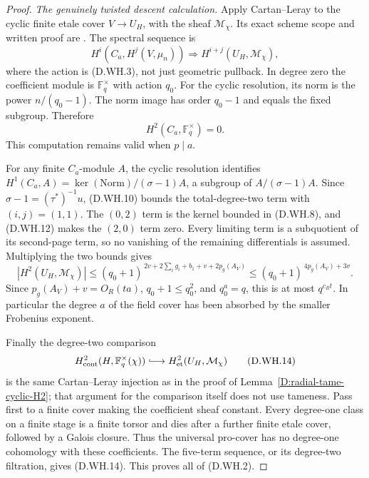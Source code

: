 \begin{proof}
\emph{The genuinely twisted descent calculation.}
Apply Cartan--Leray to the cyclic finite etale cover
\(V\to U_H\), with the sheaf \(\mathcal M_\chi\).
Its exact scheme scope and written proof are
\citet[Theorem 14.9 and Remark 14.10, pp.96--97]
{MilneLEC2013H2D}. The spectral sequence is
\[
 H^i(C_a,H^j(V,\mu_n))\Longrightarrow
                          H^{i+j}(U_H,\mathcal M_\chi),
                                                        \tag{D.WH.11}
\]
where the action is (D.WH.3), not just geometric
pullback. In degree zero the coefficient module is
\(\mathbb F_q^\times\) with action \(q_0\).
For the cyclic resolution, its norm is the power
\(n/(q_0-1)\). The norm image has order \(q_0-1\)
and equals the fixed subgroup. Therefore
\[
                       H^2(C_a,\mathbb F_q^\times)=0.
                                                        \tag{D.WH.12}
\]
This computation remains valid when \(p\mid a\).

For any finite \(C_a\)-module \(A\), the cyclic
resolution identifies
\(H^1(C_a,A)=\ker(\mathrm{Norm})/(\sigma-1)A\),
a subgroup of \(A/(\sigma-1)A\).
Since \(\sigma-1=(\tau^*)^{-1}u\), (D.WH.10)
bounds the total-degree-two term with \((i,j)=(1,1)\).
The \((0,2)\) term is the kernel bounded in
(D.WH.8), and (D.WH.12) makes the \((2,0)\)
term zero. Every limiting term is a subquotient
of its second-page term, so no vanishing of the
remaining differentials is assumed. Multiplying
the two bounds gives
\[
 |H^2(U_H,\mathcal M_\chi)|
 \le(q_0+1)^{\,2v+2\sum_i g_i+b_1+v+2p_g(A_V)}
 \le(q_0+1)^{\,4p_g(A_V)+3v}.                         \tag{D.WH.13}
\]
Since \(p_g(A_V)+v=O_R(ta)\), \(q_0+1\le q_0^2\),
and \(q_0^a=q\), this is at most \(q^{c_Rt}\).
In particular the degree \(a\) of the field cover
has been absorbed by the smaller Frobenius exponent.

Finally the degree-two comparison
\[
 H^2_{\mathrm{cont}}(H,\mathbb F_q^\times(\chi))
       \lhook\joinrel\longrightarrow
                  H^2_{\mathrm{et}}(U_H,\mathcal M_\chi)
                                                        \tag{D.WH.14}
\]
is the same Cartan--Leray injection as in the proof
of Lemma~\ref{D:radial-tame-cyclic-H2}; that argument
for the comparison itself does not use tameness.
Pass first to a finite cover making the coefficient
sheaf constant. Every degree-one class on a finite
stage is a finite torsor and dies after a further
finite etale cover, followed by a Galois closure.
Thus the universal pro-cover has no degree-one
cohomology with these coefficients. The five-term
sequence, or its degree-two filtration, gives
(D.WH.14). This proves all of (D.WH.2).
\end{proof}


